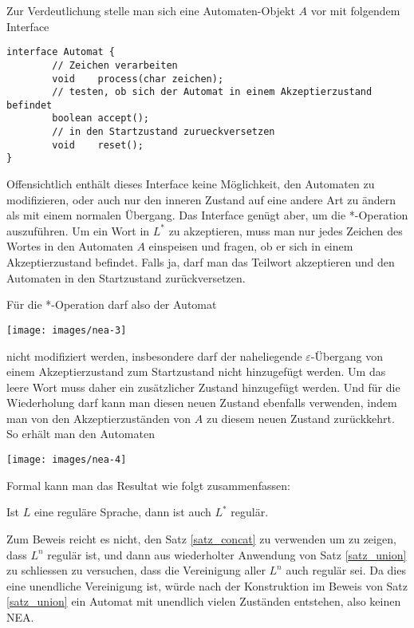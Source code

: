 Zur Verdeutlichung stelle man sich eine Automaten-Objekt $A$ vor mit
folgendem Interface
\begin{verbatim}
interface Automat {
        // Zeichen verarbeiten
        void    process(char zeichen);
        // testen, ob sich der Automat in einem Akzeptierzustand befindet
        boolean accept();
        // in den Startzustand zurueckversetzen
        void    reset();
}
\end{verbatim}
Offensichtlich enthält dieses Interface keine Möglichkeit, den Automaten
zu modifizieren, oder auch nur den inneren Zustand auf eine andere Art
zu ändern als mit einem normalen Übergang.
Das Interface genügt aber, um die *-Operation auszuführen.
Um ein Wort in $L^*$ zu akzeptieren, muss man nur jedes Zeichen
des Wortes in den Automaten $A$ einspeisen und fragen, ob er sich
in einem Akzeptierzustand befindet.
Falls ja, darf man das Teilwort
akzeptieren und den Automaten in den Startzustand zurückversetzen.

Für die *-Operation darf also der Automat
\begin{center}
\texttt{[image: images/nea-3]}
\end{center}
nicht modifiziert werden, insbesondere darf der naheliegende
$\varepsilon$-Übergang von einem Akzeptierzustand zum Startzustand
nicht hinzugefügt werden.
Um das leere Wort muss daher ein zusätzlicher Zustand hinzugefügt werden.
Und für die Wiederholung darf kann man diesen neuen Zustand ebenfalls
verwenden, indem man von den Akzeptierzuständen von $A$ zu diesem
neuen Zustand zurückkehrt.
So erhält man den Automaten
\begin{center}
\texttt{[image: images/nea-4]}
\end{center}

Formal kann man das Resultat wie folgt zusammenfassen:
\begin{satz}
%
\label{satz_star}
Ist $L$ eine reguläre Sprache, dann ist auch $L^*$ regulär.
\end{satz}

Zum Beweis reicht es nicht, den Satz \ref{satz_concat} zu verwenden
um zu zeigen, dass $L^n$ regulär ist, und dann aus wiederholter
Anwendung von Satz \ref{satz_union} zu schliessen zu versuchen,
dass die Vereinigung aller $L^n$ auch regulär sei.
Da dies eine unendliche
Vereinigung ist, würde nach der Konstruktion im Beweis von Satz
\ref{satz_union} ein Automat mit unendlich vielen
Zuständen entstehen, also keinen NEA.

